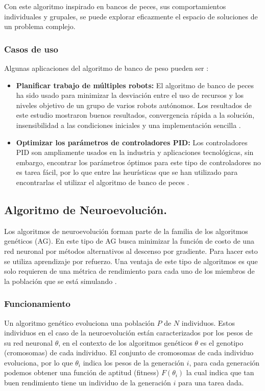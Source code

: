 \documentclass[twocolumn,spanish]{revtex4-1}
\begin{document}
Con este algoritmo inspirado en bancos de peces, sus comportamientos individuales y grupales, se puede explorar eficazmente el espacio de soluciones de un problema complejo.

\subsubsection{Casos de uso}

Algunas aplicaciones del algoritmo de banco de peso pueden ser \cite{neshat2012review}:

\begin{itemize}
    \item \textbf{Planificar trabajo de múltiples robots:} El algoritmo de banco de peces ha sido usado para minimizar la desviación entre el uso de recursos y los niveles objetivo de un grupo de varios robots autónomos. Los resultados de este estudio mostraron buenos resultados, convergencia rápida a la solución, insensibilidad a las condiciones iniciales y una implementación sencilla \cite{tian2009improved}.
    
    \item\textbf{Optimizar los parámetros de controladores PID:} Los controladores PID son ampliamente usados en la industria y aplicaciones tecnológicas, sin embargo, encontrar los parámetros óptimos para este tipo de controladores no es tarea fácil, por lo que entre las heurísticas que se han utilizado para encontrarlas el utilizar el algoritmo de banco de peces \cite{luo2010optimization}.%
\end{itemize}

\subsection{Algoritmo de Neuroevolución.}

Los algoritmos de neuroevolución forman parte de la familia de los algoritmos genéticos (AG). En este tipo de AG busca minimizar la función de costo de una red neuronal por métodos alternativos al descenso por gradiente. Para hacer esto se utiliza aprendizaje por refuerzo.  Una ventaja de este tipo de algoritmos es que solo requieren de una métrica de rendimiento para cada uno de los miembros de la población que se está simulando \cite{such2017deep}. 

\subsubsection{Funcionamiento}
Un algoritmo genético evoluciona una población $P$ de $N$ individuos. Estos individuos en el caso de la neuroevolución están caracterizados por los pesos de su red neuronal $\theta$, en el contexto de los algoritmos genéticos $\theta$ es el genotipo (cromosomas) de cada individuo. El conjunto de cromosomas de cada individuo evoluciona, por lo que $\theta_i$ indica los pesos de la generación $i$, para cada generación podemos obtener una función de aptitud (fitness) $F(\theta_i)$ la cual indica que tan buen rendimiento tiene un individuo de la generación $i$ para una tarea dada. 
\end{document}
